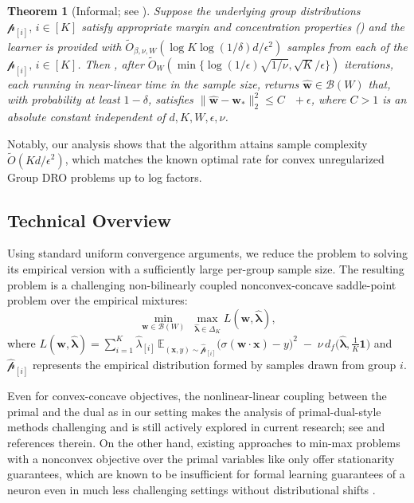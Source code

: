 \documentclass[11pt]{article}
\newcounter{thm}
\numberwithin{thm}{section}
\theoremstyle{plain}
\newtheorem{theorem}[thm]{Theorem}
\theoremstyle{definition}
\theoremstyle{remark} \newtheorem{remark}[thm]{Remark}
\def\eps{{\epsilon}}
\def\vlambda{{\bm{\lambda}}}
\def\vw{{\bm{w}}}
\def\vx{{\bm{x}}}
\def\ep{\widehat{\mathcal{p}}}
\def\pp{{\mathcal{p}}}
\def\cB{{\mathcal{B}}}
\newcommand{\E}{\mathbb{E}}
\newcommand{\ppi}{{\pp_{[i]}}}
\newcommand{\epi}{\ep_{[i]}}
\newcommand{\elambda}{\widehat{\lambda}}
\newcommand{\evlambda}{\widehat{\vlambda}}
\DeclareMathOperator{\mOPT}{OPT_m}
\def\mathbf{\bm}
\begin{document}
\begin{theorem}[Informal; see ]\label{thm:main-informal}
Suppose the underlying group distributions \(\ppi,\, i \in [K]\) satisfy appropriate margin and concentration properties () and the learner is provided with \(\tilde{O}_{\beta,\nu, W}(\log K \log(1/\delta) d/\epsilon^2)\) samples from each of the \(\ppi,\, i \in [K]\). 
Then , after \(\tilde O_W(\min\{\log(1/\epsilon)\sqrt{1/\nu},\sqrt{K}/\epsilon\})\) iterations, each running in near-linear time in the sample size, returns \(\hat{\vw}\in\cB(W)\) that, with probability at least \(1-\delta\), satisfies \(\|\hat{\vw}-\vw_*\|_2^2 \le C\,\mOPT + \epsilon\), where \(C>1\) is an absolute constant independent of  \(d, K, W, \epsilon, \nu\).
\end{theorem} 

Notably, our analysis shows that the algorithm attains sample complexity  \(\tilde O(K d/\eps^2)\), which matches the known optimal rate for convex unregularized Group DRO problems \citep{soma2022optimal,Zhang2023Stochastic} up to log factors.


\subsection{Technical Overview}\label{subsec:technical_overview}

Using standard uniform convergence arguments, we reduce the problem to solving its empirical version with a sufficiently large per-group sample size. The resulting problem is a challenging non-bilinearly coupled  nonconvex-concave saddle-point problem over the empirical mixtures:
\[
\min_{\vw \in \cB(W)}\;\max_{\evlambda\in\Delta_K} L(\vw, \evlambda),
\]
where \(L(\vw,\evlambda)
=\sum_{i=1}^K\elambda_{[i]}\,\E_{(\vx,y)\sim\epi}\!\bigl(\sigma(\vw\cdot\vx)-y\bigr)^2
\;-\;\nu\,d_f\!\big(\evlambda,\tfrac1K\mathbf1\big)\) 
and $\epi$ represents the empirical distribution formed by samples drawn from group $i$.

Even for convex-concave objectives, the nonlinear-linear coupling  between the primal and the dual as in our setting makes the analysis of primal-dual-style methods challenging and is still actively explored in current research; see \citep{mehta2025min} and references therein. On the other hand, existing approaches to min-max problems with a nonconvex objective over the primal variables like \citep{lin2020gradient,zhang2020single,rafique2022weakly,li2025nonsmooth} only offer stationarity guarantees, which are known to be insufficient for formal learning guarantees of a neuron even in much less challenging settings without distributional shifts \citep{yehudai2020learning}. 
\end{document}
